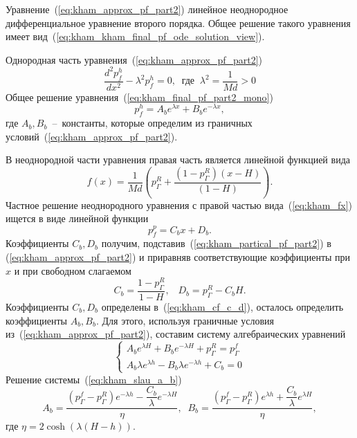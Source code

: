 \documentclass{article}
\begin{document}
Уравнение~(\ref{eq:kham_approx_pf_part2}) линейное неоднородное дифференциальное уравнение второго порядка.
Общее решение такого уравнения имеет вид~(\ref{eq:kham_kham_final_pf_ode_solution_view}).

Однородная часть уравнения~(\ref{eq:kham_approx_pf_part2})
\begin{equation}
\displaystyle
\dfrac{d^2 p_f^h}{dx^2}-\lambda^2 p_f^h = 0, \;\; \text{где} \;\; \lambda^2 = \dfrac{1}{Md} > 0
\label{eq:kham_final_pf_part2_mono}
\end{equation}
Общее решение уравнения~(\ref{eq:kham_final_pf_part2_mono})
\begin{equation}
\displaystyle
p_f^h = A_b e^{\lambda x} + B_b e^{-\lambda x},
\label{eq:kham_final_pf_part2_mono_solution}
\end{equation}
где $A_b, B_b$~--~константы, которые определим из граничных условий~(\ref{eq:kham_approx_pf_part2}).

В неоднородной части уравнения правая часть является линейной функцией вида
\begin{equation}
\displaystyle
f\left(x\right)=\dfrac{1}{Md} \left(p^R_{\Gamma} + \dfrac{\left( 1-p^R_{\Gamma}\right)\left(x-H\right)}{\left(1-H\right)}\right).
\label{eq:kham_fx}
\end{equation}
Частное решение неоднородного уравнения с правой частью вида~(\ref{eq:kham_fx}) ищется в виде линейной функции
\begin{equation}
\displaystyle
p_f^p = C_b x + D_b.
\label{eq:kham_partical_pf_part2}
\end{equation}
Коэффициенты $C_b, D_b$ получим, подставив~(\ref{eq:kham_partical_pf_part2}) в (\ref{eq:kham_approx_pf_part2}) и приравняв соответствующие коэффициенты при $x$ и при свободном слагаемом
\begin{equation}
\displaystyle
C_b = \dfrac{1-p^R_{\Gamma}}{1-H}, \;\;\;
D_b = p^R_{\Gamma} - C_b H.
\label{eq:kham_cf_c_d}
\end{equation}
Коэффициенты $C_b, D_b$ определены в~(\ref{eq:kham_cf_c_d}), осталось определить коэффициенты $A_b, B_b$. Для этого, используя граничные условия из~(\ref{eq:kham_approx_pf_part2}), составим систему алгебраических уравнений
\begin{equation}
\displaystyle
\begin{cases}
A_b e^{\lambda H} + B_b e^{-\lambda H} + p^R_{\Gamma} = p^f_{\Gamma} \\
A_b \lambda e^{\lambda h} - B_b \lambda e^{-\lambda h} + C_b = 0
\end{cases}
\label{eq:kham_slau_a_b}
\end{equation}
Решение системы~(\ref{eq:kham_slau_a_b})
\begin{equation}
\displaystyle
A_b = \frac{\left(p^f_{\Gamma} - p^R_{\Gamma}\right) e^{- \lambda h} - \dfrac{C_b}{\lambda} e^{-\lambda H}}{\eta}, \;\;
B_b = \frac{\left(p^f_{\Gamma} - p^R_{\Gamma}\right) e^{\lambda h} + \dfrac{C_b}{\lambda} e^{\lambda H}}{\eta},
\label{eq:kham_a_b_slau_solution}
\end{equation}
где $\eta = 2 \cosh{\left(\lambda \left(H-h\right)\right)}$.
\end{document}
